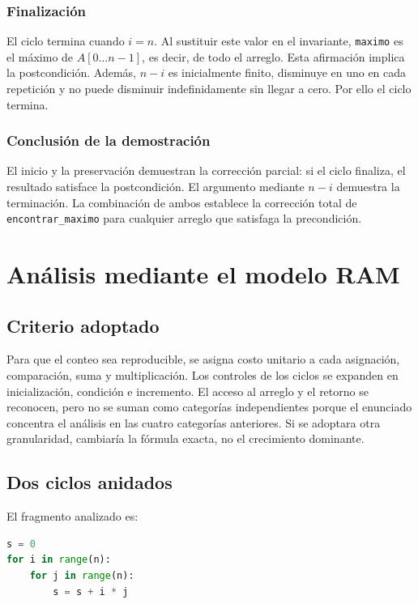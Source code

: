 \documentclass[12pt,letterpaper]{article}
\newcommand{\codigo}[1]{\texttt{#1}}
\begin{document}
\subsubsection{Finalización}

El ciclo termina cuando $i=n$. Al sustituir este valor en el invariante, \codigo{maximo} es el máximo de $A[0\ldots n-1]$, es decir, de todo el arreglo. Esta afirmación implica la postcondición. Además, $n-i$ es inicialmente finito, disminuye en uno en cada repetición y no puede disminuir indefinidamente sin llegar a cero. Por ello el ciclo termina.

\subsubsection{Conclusión de la demostración}

El inicio y la preservación demuestran la corrección parcial: si el ciclo finaliza, el resultado satisface la postcondición. El argumento mediante $n-i$ demuestra la terminación. La combinación de ambos establece la corrección total de \codigo{encontrar\_maximo} para cualquier arreglo que satisfaga la precondición.

\section{Análisis mediante el modelo RAM}

\subsection{Criterio adoptado}

Para que el conteo sea reproducible, se asigna costo unitario a cada asignación, comparación, suma y multiplicación. Los controles de los ciclos se expanden en inicialización, condición e incremento. El acceso al arreglo y el retorno se reconocen, pero no se suman como categorías independientes porque el enunciado concentra el análisis en las cuatro categorías anteriores. Si se adoptara otra granularidad, cambiaría la fórmula exacta, no el crecimiento dominante.

\subsection{Dos ciclos anidados}
\label{sec:ramdoble}

El fragmento analizado es:

\begin{lstlisting}[style=codigo,language=Python,caption={Fragmento original}]
s = 0
for i in range(n):
    for j in range(n):
        s = s + i * j
\end{lstlisting}
\end{document}
